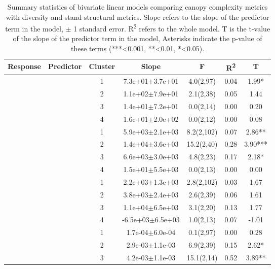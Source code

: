 \setlength{\tabcolsep}{4pt}
\begin{longtable}{llccccS[table-format=-2.2, table-space-text-post = {***}]}
\caption{Summary statistics of bivariate linear models comparing canopy complexity metrics with diversity and stand structural metrics. Slope refers to the slope of the predictor term in the model, $\pm{}$ 1 standard error. R\textsuperscript{2} refers to the whole model. T is the t-value of the slope of the predictor term in the model, Asterisks indicate the p-value of these terms (***<0.001, **<0.01, *<0.05).} \\ 
  \toprule
{Response} & {Predictor} & {Cluster} & {Slope} & {F} & {R\textsuperscript{2}} & {T} \\ 
  \midrule
{} & {} & 1 &  7.3e+01$\pm$3.7e+01 & 4.0(2,97) & 0.04 & 1.99* \\ 
   &  & 2 &  1.1e+02$\pm$7.9e+01 & 2.1(2,38) & 0.05 & 1.44 \\ 
   &  & 3 &  1.4e+01$\pm$7.2e+01 & 0.0(2,14) & 0.00 & 0.20 \\ 
   &  & 4 &  1.6e+01$\pm$2.0e+02 & 0.0(2,12) & 0.00 & 0.08 \\ 
   \midrule
{} & {} & 1 &  5.9e+03$\pm$2.1e+03 & 8.2(2,102) & 0.07 & 2.86** \\ 
   &  & 2 &  1.4e+04$\pm$3.6e+03 & 15.2(2,40) & 0.28 & 3.90*** \\ 
   &  & 3 &  6.6e+03$\pm$3.0e+03 & 4.8(2,23) & 0.17 & 2.18* \\ 
   &  & 4 &  1.5e+01$\pm$5.5e+03 & 0.0(2,13) & 0.00 & 0.00 \\ 
   \midrule
{} & {} & 1 &  2.2e+03$\pm$1.3e+03 & 2.8(2,102) & 0.03 & 1.67 \\ 
   &  & 2 &  3.8e+03$\pm$2.4e+03 & 2.6(2,39) & 0.06 & 1.61 \\ 
   &  & 3 &  1.1e+04$\pm$6.5e+03 & 3.1(2,20) & 0.13 & 1.77 \\ 
   &  & 4 & -6.5e+03$\pm$6.5e+03 & 1.0(2,13) & 0.07 & -1.01 \\ 
   \midrule
{} & {} & 1 &  1.7e-04$\pm$6.0e-04 & 0.1(2,97) & 0.00 & 0.28 \\ 
   &  & 2 &  2.9e-03$\pm$1.1e-03 & 6.9(2,39) & 0.15 & 2.62* \\ 
   &  & 3 &  4.2e-03$\pm$1.1e-03 & 15.1(2,14) & 0.52 & 3.89** \\ 

\end{longtable}
